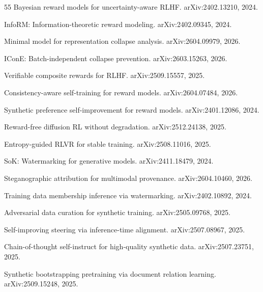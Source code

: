 \documentclass[11pt]{article}
\begin{document}
\begin{thebibliography}{55}
Bayesian reward models for uncertainty-aware RLHF.
\newblock arXiv:2402.13210, 2024.

InfoRM: Information-theoretic reward modeling.
\newblock arXiv:2402.09345, 2024.

Minimal model for representation collapse analysis.
\newblock arXiv:2604.09979, 2026.

IConE: Batch-independent collapse prevention.
\newblock arXiv:2603.15263, 2026.

Verifiable composite rewards for RLHF.
\newblock arXiv:2509.15557, 2025.

Consistency-aware self-training for reward models.
\newblock arXiv:2604.07484, 2026.

Synthetic preference self-improvement for reward models.
\newblock arXiv:2401.12086, 2024.

Reward-free diffusion RL without degradation.
\newblock arXiv:2512.24138, 2025.

Entropy-guided RLVR for stable training.
\newblock arXiv:2508.11016, 2025.

SoK: Watermarking for generative models.
\newblock arXiv:2411.18479, 2024.

Steganographic attribution for multimodal provenance.
\newblock arXiv:2604.10460, 2026.

Training data membership inference via watermarking.
\newblock arXiv:2402.10892, 2024.

Adversarial data curation for synthetic training.
\newblock arXiv:2505.09768, 2025.

Self-improving steering via inference-time alignment.
\newblock arXiv:2507.08967, 2025.

Chain-of-thought self-instruct for high-quality synthetic data.
\newblock arXiv:2507.23751, 2025.

Synthetic bootstrapping pretraining via document relation learning.
\newblock arXiv:2509.15248, 2025.


\end{thebibliography}
\end{document}
